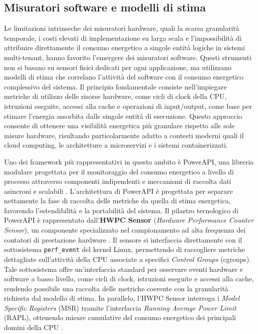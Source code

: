 \subsection{Misuratori software e modelli di stima}

Le limitazioni intrinseche dei misuratori hardware, quali la scarsa granularità
temporale, i costi elevati di implementazione su larga scala e l’impossibilità di
attribuire direttamente il consumo energetico a singole entità logiche in sistemi
multi-tenant, hanno favorito l’emergere dei misuratori software.
Questi strumenti non si basano su sensori fisici dedicati per ogni applicazione,
ma utilizzano modelli di stima che correlano l’attività del software con il consumo
energetico complessivo del sistema.
Il principio fondamentale consiste nell’impiegare metriche di utilizzo delle
risorse hardware, come cicli di clock della CPU, istruzioni eseguite, accessi alla
cache e operazioni di input/output, come base per stimare l’energia
assorbita dalle singole entità di esecuzione.
Questo approccio consente di ottenere una visibilità energetica più granulare
rispetto alle sole misure hardware, risultando particolarmente adatto a contesti
moderni quali il cloud computing, le architetture a microservizi e i sistemi
containerizzati.

Uno dei framework più rappresentativi in questo ambito è PowerAPI, una libreria modulare progettata per il monitoraggio del consumo energetico a livello di processo attraverso componenti indipendenti e meccanismi di raccolta dati asincroni e scalabili
\cite{fieni:hal-02470128}. L’architettura di PowerAPI è progettata per separare nettamente la fase di raccolta
delle metriche da quella di stima energetica, favorendo l’estendibilità e la
portabilità del sistema. Il pilastro tecnologico di PowerAPI è rappresentato dall’\textbf{HWPC Sensor}
(\textit{Hardware Performance Counter Sensor}), un componente specializzato nel
campionamento ad alta frequenza dei contatori di prestazione hardware
\cite{powerapi-hwpc}.
Il sensore si interfaccia direttamente con il sottosistema \texttt{perf\_event} del
kernel Linux, permettendo di raccogliere metriche dettagliate sull’attività della
CPU associate a specifici \textit{Control Groups} (cgroups). Tale sottosistema
offre un’interfaccia standard per osservare eventi hardware e software a basso
livello, come cicli di clock, istruzioni eseguite e accessi alla cache, rendendo
possibile una raccolta delle metriche coerente con la granularità richiesta dal
modello di stima. In parallelo, l’HWPC Sensor interroga i \textit{Model Specific Registers}
(MSR)
tramite l’interfaccia \textit{Running Average Power Limit} (RAPL), ottenendo misure
cumulative del consumo energetico dei principali domini della CPU
\cite{rapl-evaluation}.

